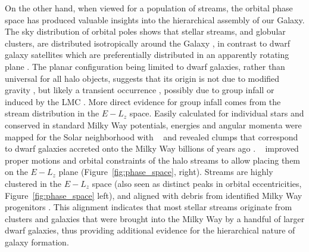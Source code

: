 \documentclass[final,5p,times,twocolumn,authoryear]{elsarticle}
\begin{document}
On the other hand, when viewed for a population of streams, the orbital phase space has produced valuable insights into the hierarchical assembly of our Galaxy.
The sky distribution of orbital poles shows that stellar streams, and globular clusters, are distributed isotropically around the Galaxy \citep{riley:2020, vasiliev:2019b}, in contrast to dwarf galaxy satellites which are preferentially distributed in an apparently rotating plane \citep[e.g.,][]{pawlowski:2012, pawlowski:2020, fritz:2018}.
The planar configuration being limited to dwarf galaxies, rather than universal for all halo objects, suggests that its origin is not due to modified gravity \citep[e.g.,][]{pawlowski:2018}, but likely a transient occurrence \citep{sawala:2023, xu:2023}, possibly due to group infall \citep{patel:2020} or induced by the LMC \citep{garavito-camargo:2021,garavito-camargo:2024}.
More direct evidence for group infall comes from the stream distribution in the $E-L_z$ space.
Easily calculated for individual stars and conserved in standard Milky Way potentials, energies and angular momenta were mapped for the Solar neighborhood with \gaia~ and revealed clumps that correspond to dwarf galaxies accreted onto the Milky Way billions of years ago \citep[e.g.,][]{helmi:2018,belokurov:2018,myeong:2019}.
\gaia~ improved proper motions and orbital constraints of the halo streams to allow placing them on the $E-L_z$ plane (Figure~\ref{fig:phase_space}, right).
Streams are highly clustered in the $E-L_z$ space (also seen as distinct peaks in orbital eccentricities, Figure~\ref{fig:phase_space} left), and aligned with debris from identified Milky Way progenitors \citep{bonaca:2021,malhan:2022}.
This alignment indicates that most stellar streams originate from clusters and galaxies that were brought into the Milky Way by a handful of larger dwarf galaxies, thus providing additional evidence for the hierarchical nature of galaxy formation.
\end{document}
